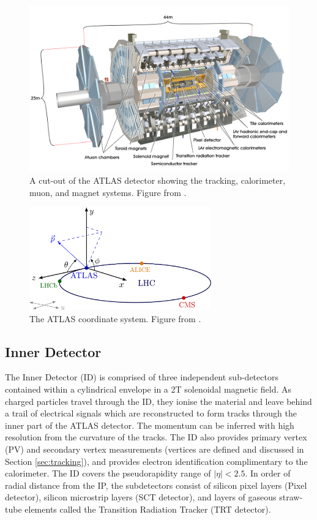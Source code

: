 \begin{figure}[t]
    \centering
    \includegraphics[width=\textwidth]{plots/atlas/ATLAS_Detector.jpg}
    \caption{A cut-out of the ATLAS detector showing the tracking, calorimeter, muon, and magnet systems. Figure from \cite{Atlas:detector}. \label{fig:atlas_detector} }
\end{figure}

\begin{figure}[t]
    \centering
    \includegraphics[width=0.7\textwidth]{plots/atlas/ATLAS_coordinates.png}
    \caption{The ATLAS coordinate system. Figure from \cite{Atlas:coordinates}.\label{fig:atlas_coordinates}}
\end{figure}

\subsection{Inner Detector}
The Inner Detector (ID) is comprised of three independent sub-detectors contained within a cylindrical envelope in a 2T solenoidal magnetic field. As charged particles travel through the ID, they ionise the material and leave behind a trail of electrical signals which are reconstructed to form tracks through the inner part of the ATLAS detector. The momentum can be inferred with high resolution from the curvature of the tracks. The ID also provides primary vertex (PV) and secondary vertex measurements (vertices are defined and discussed in Section \ref{sec:tracking}), and provides electron identification complimentary to the calorimeter. The ID covers the pseudorapidity range of $|\eta|<2.5$. In order of radial distance from the IP, the subdetectors consist of silicon pixel layers (Pixel detector), silicon microstrip layers (SCT detector), and layers of gaseous straw-tube elements called the Transition Radiation Tracker (TRT detector).  
